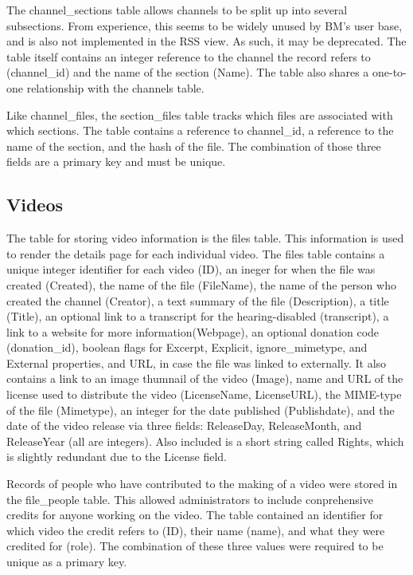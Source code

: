 \documentclass[a4paper,12pt]{report}
\begin{document}
The channel\_sections table allows channels to be split up into several subsections. From experience, this seems to be widely unused by BM's user base, and is also not implemented in the RSS view. As such, it may be deprecated. The table itself contains an integer reference to the channel the record refers to (channel\_id) and the name of the section (Name). The table also shares a one-to-one relationship with the channels table.


Like channel\_files, the section\_files table tracks which files are associated with which sections. The table contains a reference to channel\_id, a reference to the name of the section, and the hash of the file. The combination of those three fields are a primary key and must be unique.


\subsection{Videos}
The table for storing video information is the files table. This information is used to render the details page for each individual video. The files table contains a unique integer identifier for each video (ID), an ineger for when the file was created (Created), the name of the file (FileName), the name of the person who created the channel (Creator), a text summary of the file (Description), a title (Title), an optional link to a transcript for the hearing-disabled (transcript), a link to a website for more information(Webpage), an optional donation code (donation\_id), boolean flags for Excerpt, Explicit, ignore\_mimetype, and External properties, and URL, in case the file was linked to externally. It also contains a link to an image thumnail of the video (Image), name and URL of the license used to distribute the video (LicenseName, LicenseURL), the MIME-type of the file (Mimetype), an integer for the date published (Publishdate), and the date of the video release via three fields: ReleaseDay, ReleaseMonth, and ReleaseYear (all are integers). Also included is a short string called Rights, which is slightly redundant due to the License field. 


Records of people who have contributed to the making of a video were stored in the file\_people table. This allowed administrators to include conprehensive credits for anyone working on the video. The table contained an identifier for which video the credit refers to (ID), their name (name), and what they were credited for (role). The combination of these three values were required to be unique as a primary key.
\end{document}
